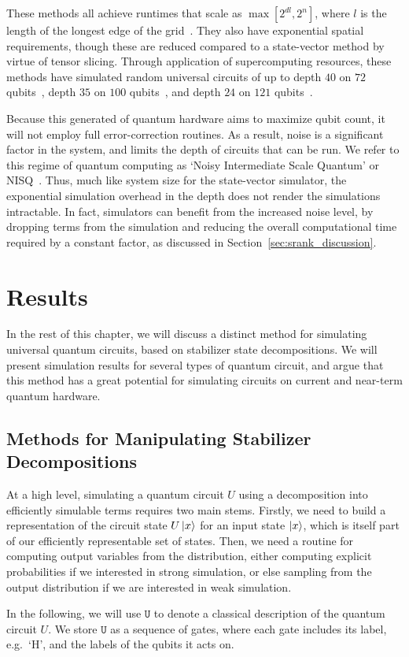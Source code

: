 These methods all achieve runtimes that scale as $\max \left[ 2^{dl}, 2^{n}\right]$, where $l$ is the length of the longest edge of the grid~\cite{Markov2005}. They also have exponential spatial requirements, though these are reduced compared to a state-vector method by virtue of tensor slicing. Through application of supercomputing resources, these methods have simulated random universal circuits of up to depth $40$ on $72$ qubits~\cite{Villalonga2018}, depth $35$ on $100$ qubits~\cite{Chen2018}, and depth $24$ on $121$ qubits~\cite{Villalonga2019}.\par
Because this generated of quantum hardware aims to  maximize qubit count, it will not employ full error-correction routines. As a result, noise is a significant factor in the system, and limits the depth of circuits that can be run. We refer to this regime of quantum computing as `Noisy Intermediate Scale Quantum' or NISQ~\cite{Preskill2018}. Thus, much like system size for the state-vector simulator, the exponential simulation overhead in the depth does not render the simulations intractable. In fact, simulators can benefit from the increased noise level, by dropping terms from the simulation and reducing the overall computational time required by a constant factor, as discussed in Section~\ref{sec:srank_discussion}.
\section{Results}
In the rest of this chapter, we will discuss a distinct method for simulating universal quantum circuits, based on stabilizer state decompositions. We will present simulation results for several types of quantum circuit, and argue that this method has a great potential for simulating circuits on current and near-term quantum hardware.\par
\subsection{Methods for Manipulating Stabilizer Decompositions}
At a high level, simulating a quantum circuit $U$ using a decomposition into efficiently simulable terms requires two main stems. Firstly, we need to build a representation of the circuit state $U\ket{x}$ for an input state $\ket{x}$, which is itself part of our efficiently representable set of states. Then, we need a routine for computing output variables from the distribution, either computing explicit probabilities if we interested in strong simulation, or else sampling from the output distribution if we are interested in weak simulation.\par
In the following, we will use $\mathtt{U}$ to denote a classical description of the quantum circuit $U$. We store $\mathtt{U}$ as a sequence of gates, where each gate includes its label, e.g.\ `H', and the labels of the qubits it acts on.\par

